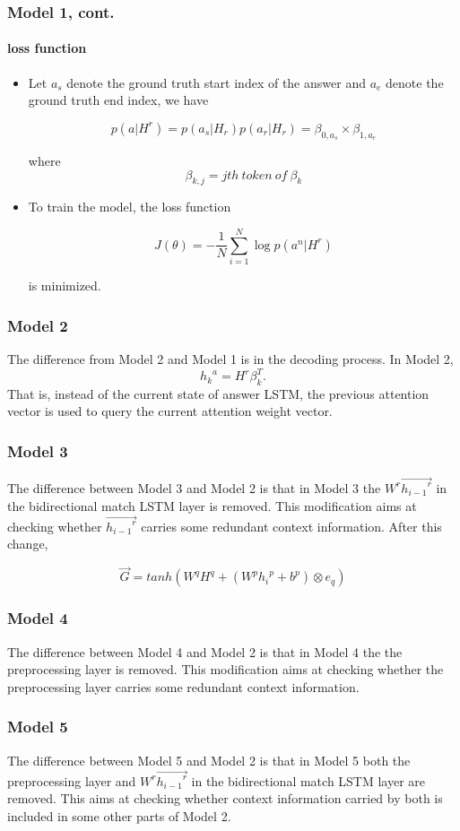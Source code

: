 \documentclass{beamer}
\begin{document}
\begin{frame}\frametitle{Model 1, cont.}\framesubtitle{loss function}
    \begin{itemize}
        \item Let $a_s$ denote the ground truth start index of the answer and $a_e$ denote the ground truth end index, we have

        $$p(a|H^r) = p(a_s|H_r)p(a_r|H_r)=\beta _{0, a_s} \times \beta_{1, a_e}$$

        where $$\beta_{k, j} = jth\ token\ of\ \beta _k$$
        \item To train the model, the loss function

        $$J(\theta) = -\frac{1}{N}\sum_{i=1}^{N} \log{p(a^n|H^r)} $$

        is minimized.

    \end{itemize}

\end{frame}

\begin{frame} \frametitle{Model 2}
    The difference from Model 2 and Model 1 is in the decoding process. In Model 2,
    $${h_k}^a = H^r\beta _{k}^T.$$
    That is, instead of the current state of answer LSTM, the previous attention vector is used to query the current attention weight vector.
\end{frame}

\begin{frame} \frametitle{Model 3}
    The difference between Model 3 and Model 2 is that in Model 3 the $W^r\overrightarrow{{h_{i-1}}^r}$ in the bidirectional match LSTM layer is removed. This modification aims at checking whether $\overrightarrow{{h_{i-1}}^r}$ carries some redundant context information. After this change,


    $$\overrightarrow{G} = tanh(W^qH^q + (W^p{h_i}^p + b^p) \otimes e_q)$$
\end{frame}

\begin{frame} \frametitle{Model 4}
    The difference between Model 4 and Model 2 is that in Model 4 the the preprocessing layer is removed. This modification aims at checking whether the preprocessing layer carries some redundant context information.
\end{frame}

\begin{frame} \frametitle{Model 5}
    The difference between Model 5 and Model 2 is that in Model 5 both the preprocessing layer and $W^r\overrightarrow{{h_{i-1}}^r}$ in the bidirectional match LSTM layer are removed. This aims at checking whether context information carried by both is included in some other parts of Model 2.
\end{frame}
\end{document}
